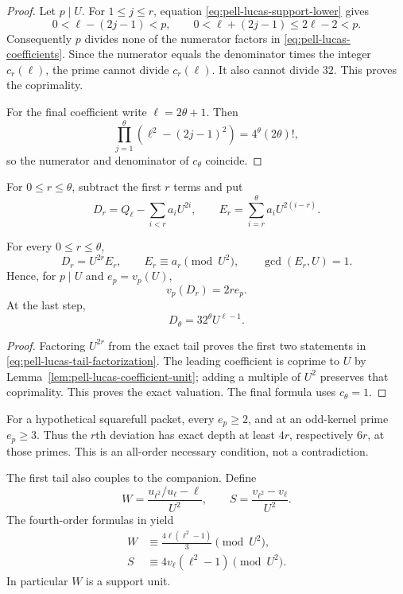 \begin{proof}
Let $p\mid U$.  For $1\le j\le r$, equation
\eqref{eq:pell-lucas-support-lower} gives
\[
 0<\ell-(2j-1)<p,
 \qquad 0<\ell+(2j-1)\le2\ell-2<p.
\]
Consequently $p$ divides none of the numerator factors in
\eqref{eq:pell-lucas-coefficients}.  Since the numerator equals the
denominator times the integer $c_r(\ell)$, the prime cannot divide
$c_r(\ell)$.  It also cannot divide $32$.  This proves the coprimality.

For the final coefficient write $\ell=2\theta+1$.  Then
\[
 \prod_{j=1}^{\theta}
    (\ell^2-(2j-1)^2)=4^\theta(2\theta)!,
\]
so the numerator and denominator of $c_\theta$ coincide.
\end{proof}

For $0\le r\le\theta$, subtract the first $r$ terms and put
\[
 D_r=Q_\ell-\sum_{i<r}a_iU^{2i},
 \qquad
 E_r=\sum_{i=r}^{\theta}a_iU^{2(i-r)}.
\]

\begin{theorem}
\label{thm:pell-lucas-all-order-staircase}
For every $0\le r\le\theta$,
\begin{equation}\label{eq:pell-lucas-tail-factorization}
 D_r=U^{2r}E_r,\qquad E_r\equiv a_r\pmod{U^2},
 \qquad \gcd(E_r,U)=1.
\end{equation}
Hence, for $p\mid U$ and $e_p=v_p(U)$,
\begin{equation}\label{eq:pell-lucas-exact-staircase}
                         v_p(D_r)=2re_p.
\end{equation}
At the last step,
\[
                         D_\theta=32^\theta U^{\ell-1}.
\]
\end{theorem}

\begin{proof}
Factoring $U^{2r}$ from the exact tail proves the first two statements in
\eqref{eq:pell-lucas-tail-factorization}.  The leading coefficient is
coprime to $U$ by Lemma~\ref{lem:pell-lucas-coefficient-unit}; adding a
multiple of $U^2$ preserves that coprimality.  This proves the exact
valuation.  The final formula uses $c_\theta=1$.
\end{proof}

For a hypothetical squarefull packet, every $e_p\ge2$, and at an
odd-kernel prime $e_p\ge3$.  Thus the $r$th deviation has exact depth at
least $4r$, respectively $6r$, at those primes.  This is an all-order
necessary condition, not a contradiction.

The first tail also couples to the companion.  Define
\[
 W=\frac{u_{\ell^2}/u_\ell-\ell}{U^2},
 \qquad
 S=\frac{v_{\ell^2}-v_\ell}{U^2}.
\]
The fourth-order formulas in
\cite[Corollary~5.2]{ZhangLucas2026} yield
\begin{align}
 W&\equiv\frac{4\ell(\ell^2-1)}3\pmod{U^2},
 \label{eq:pell-lucas-W}\\
 S&\equiv4v_\ell(\ell^2-1)\pmod{U^2}.
 \label{eq:pell-lucas-S}
\end{align}
In particular $W$ is a support unit.

